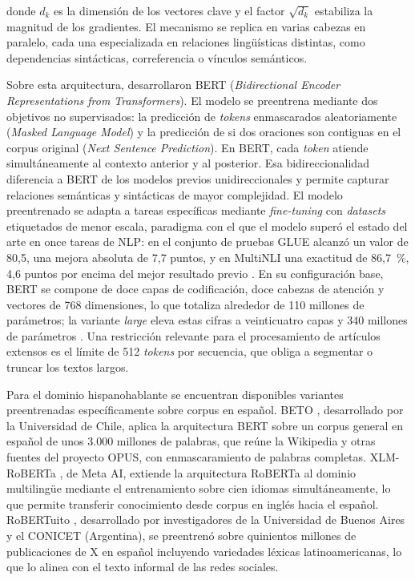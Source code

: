 \noindent donde $d_k$ es la dimensión de los vectores clave y el factor $\sqrt{d_k}$ estabiliza la magnitud de los gradientes. El mecanismo se replica en varias cabezas en paralelo, cada una especializada en relaciones lingüísticas distintas, como dependencias sintácticas, correferencia o vínculos semánticos.

Sobre esta arquitectura, \textcite{DevlinEtAl2019} desarrollaron BERT (\textit{Bidirectional Encoder Representations from Transformers}). El modelo se preentrena mediante dos objetivos no supervisados: la predicción de \textit{tokens} enmascarados aleatoriamente (\textit{Masked Language Model}) y la predicción de si dos oraciones son contiguas en el corpus original (\textit{Next Sentence Prediction}). En BERT, cada \textit{token} atiende simultáneamente al contexto anterior y al posterior. Esa bidireccionalidad diferencia a BERT de los modelos previos unidireccionales y permite capturar relaciones semánticas y sintácticas de mayor complejidad. El modelo preentrenado se adapta a tareas específicas mediante \textit{fine-tuning} con \textit{datasets} etiquetados de menor escala, paradigma con el que el modelo superó el estado del arte en once tareas de NLP: en el conjunto de pruebas GLUE alcanzó un valor de 80,5, una mejora absoluta de 7,7 puntos, y en MultiNLI una exactitud de 86,7~\%, 4,6 puntos por encima del mejor resultado previo \parencite{DevlinEtAl2019}. En su configuración base, BERT se compone de doce capas de codificación, doce cabezas de atención y vectores de 768 dimensiones, lo que totaliza alrededor de 110 millones de parámetros; la variante \textit{large} eleva estas cifras a veinticuatro capas y 340 millones de parámetros \parencite{DevlinEtAl2019}. Una restricción relevante para el procesamiento de artículos extensos es el límite de 512 \textit{tokens} por secuencia, que obliga a segmentar o truncar los textos largos.

Para el dominio hispanohablante se encuentran disponibles variantes preentrenadas específicamente sobre corpus en español. BETO \parencite{CañeteEtAl2020}, desarrollado por la Universidad de Chile, aplica la arquitectura BERT sobre un corpus general en español de unos 3.000 millones de palabras, que reúne la Wikipedia y otras fuentes del proyecto OPUS, con enmascaramiento de palabras completas. XLM-RoBERTa \parencite{ConneauEtAl2020}, de Meta AI, extiende la arquitectura RoBERTa al dominio multilingüe mediante el entrenamiento sobre cien idiomas simultáneamente, lo que permite transferir conocimiento desde corpus en inglés hacia el español. RoBERTuito \parencite{PerezEtAl2022}, desarrollado por investigadores de la Universidad de Buenos Aires y el CONICET (Argentina), se preentrenó sobre quinientos millones de publicaciones de X en español incluyendo variedades léxicas latinoamericanas, lo que lo alinea con el texto informal de las redes sociales.

